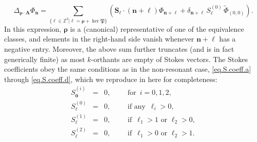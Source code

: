 \documentclass[11pt,a4paper]{article}
\def\BZ{{\mathbb Z}}
\newcommand{\be}{\begin{equation}}
\newcommand{\ee}{\end{equation}}
\newcommand{\bea}{\begin{eqnarray}}
\newcommand{\eea}{\end{eqnarray}}
\begin{document}
%
\be
\label{eq:bridgeres}
\Delta_{\boldsymbol{\rho} \cdot \boldsymbol{A}} \Phi_{\boldsymbol{n}} = \sum_{\{ \boldsymbol{\ell} \in \BZ^2 | \boldsymbol{\ell} = \boldsymbol{\rho} + \ker \mathfrak{P} \}} \left( \boldsymbol{S}_{\boldsymbol{\ell}} \cdot \left(\boldsymbol{n}+\boldsymbol{\ell} \right) \Phi_{\boldsymbol{n}+\boldsymbol{\ell}} + \delta_{\boldsymbol{n}+\boldsymbol{\ell}}\, S_{\boldsymbol{\ell}}^{(0)}\, \widetilde{\Phi}_{(0,0)} \right).
\ee
%
\noindent
In this expression, $\boldsymbol{\rho}$ is a (canonical) representative of one of the equivalence classes, and elements in the right-hand side vanish whenever $\boldsymbol{n}+\boldsymbol{\ell}$ has a negative entry. Moreover, the above sum further truncates (and is in fact generically finite) as most $k$-orthants are empty of Stokes vectors. The Stokes coefficients obey the same conditions as in the non-resonant case, \eqref{eq.S.coeff.a} through \eqref{eq.S.coeff.d}, which we reproduce in here for completeness:
%
\bea
S^{(i)}_{\boldsymbol{0}} &=& 0, \qquad \text{ for }\, i=0,1,2, \\
S^{(0)}_{\boldsymbol{\ell}} &=& 0, \qquad \text{ if any }\, \ell_i>0, \\
S^{(1)}_{\boldsymbol{\ell}} &=& 0, \qquad \text{ if }\, \ell_1>1 \text{  or  } \ell_2>0, \\
S^{(2)}_{\boldsymbol{\ell}} &=& 0, \qquad \text{ if }\, \ell_1>0 \text{  or  } \ell_2>1.
\eea
\end{document}
